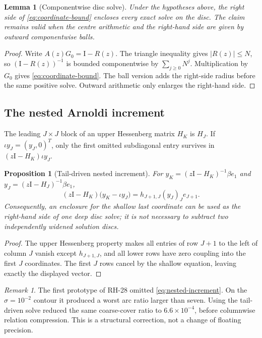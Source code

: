 \documentclass[11pt]{article}
\newtheorem{proposition}[theorem]{Proposition}
\newtheorem{lemma}[theorem]{Lemma}
\theoremstyle{definition}
\theoremstyle{remark}
\newtheorem{remark}[theorem]{Remark}
\newcommand{\Id}{\mathrm I}
\newcommand{\absentry}[1]{\left|#1\right|}
\begin{document}
\begin{lemma}[Componentwise disc solve]
\label{lem:disc-solve}
Under the hypotheses above, the right side of
\cref{eq:coordinate-bound} encloses every exact solve on the disc.  The claim
remains valid when the centre arithmetic and the right-hand side are given
by outward componentwise balls.
\end{lemma}

\begin{proof}
Write $A(z)G_0=\Id-R(z)$.  The triangle inequality gives
$\absentry{R(z)}\leq N$, so $(\Id-R(z))^{-1}$ is bounded componentwise by
$\sum_{j\geq0}N^j$.  Multiplication by $G_0$ gives
\cref{eq:coordinate-bound}.  The ball version adds the right-side radius
before the same positive solve.  Outward arithmetic only enlarges the
right-hand side.
\end{proof}

\subsection{The nested Arnoldi increment}

The leading $J\times J$ block of an upper Hessenberg matrix $H_K$ is
$H_J$.  If $\iota y_J=(y_J,0)^T$, only the first omitted subdiagonal entry
survives in $(z\Id-H_K)\iota y_J$.

\begin{proposition}[Tail-driven nested increment]
\label{prop:nested-increment}
For $y_K=(z\Id-H_K)^{-1}\beta e_1$ and
$y_J=(z\Id-H_J)^{-1}\beta e_1$,
\begin{equation}
 (z\Id-H_K)\bigl(y_K-\iota y_J\bigr)
 =h_{J+1,J}(y_J)_J e_{J+1}.
 \label{eq:nested-increment}
\end{equation}
Consequently, an enclosure for the shallow last coordinate can be used as
the right-hand side of one deep disc solve; it is not necessary to subtract
two independently widened solution discs.
\end{proposition}

\begin{proof}
The upper Hessenberg property makes all entries of row $J+1$ to the left of
column $J$ vanish except $h_{J+1,J}$, and all lower rows have zero coupling
into the first $J$ coordinates.  The first $J$ rows cancel by the shallow
equation, leaving exactly the displayed vector.
\end{proof}

\begin{remark}
The first prototype of RH-28 omitted \cref{eq:nested-increment}.  On the
$\sigma=10^{-2}$ contour it produced a worst arc ratio larger than seven.
Using the tail-driven solve reduced the same coarse-cover ratio to
$6.6\times10^{-4}$, before columnwise relation compression.  This is a
structural correction, not a change of floating precision.
\end{remark}
\end{document}
